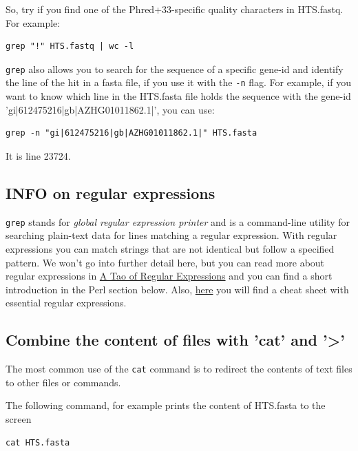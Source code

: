 \documentclass[11pt]{article}
\begin{document}
So, try if you find one of the Phred+33-specific quality characters in
HTS.fastq. For example:

\begin{verbatim}
grep "!" HTS.fastq | wc -l
\end{verbatim}



\texttt{grep} also allows you to search for the sequence of a specific
gene-id and identify the line of the hit in a fasta file, if you use
it with the \texttt{-n} flag. For example, if you want to know which line
in the HTS.fasta file holds the sequence with the gene-id
'gi|612475216|gb|AZHG01011862.1|', you can use:

\begin{verbatim}
grep -n "gi|612475216|gb|AZHG01011862.1|" HTS.fasta
\end{verbatim}

It is line 23724.

\subsection{INFO on regular expressions}
\label{sec:orgheadline22}

\texttt{grep} stands for \emph{global regular expression printer} and is a
command-line utility for searching plain-text data for lines matching
a regular expression. With regular expressions you can match strings
that are not identical but follow a specified pattern.  We won't
go into further detail here, but you can read more about regular
expressions in \href{http://www.scootersoftware.com/RegEx.html}{A Tao of Regular Expressions} and you can find a 
short introduction in the Perl section below. Also, \href{http://www.cheatography.com/davechild/cheat-sheets/regular-expressions/}{here} you will find
a cheat sheet with essential regular expressions.

\subsection{Combine the content of files with 'cat' and '>'}
\label{sec:orgheadline23}
The most common use of the \texttt{cat} command is to redirect the contents of
text files to other files or commands.

The following command, for example prints the content of HTS.fasta to the screen

\begin{verbatim}
cat HTS.fasta
\end{verbatim}
\end{document}
